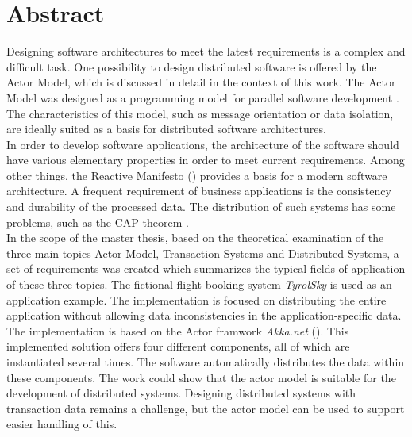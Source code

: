 
\chapter*{Abstract}
Designing software architectures to meet the latest requirements is a complex and difficult task. One possibility to design distributed software is offered by the Actor Model, which is discussed in detail in the context of this work. The Actor Model was designed as a programming model for parallel software development \citep{hewitt1973session}. The characteristics of this model, such as message orientation or data isolation, are ideally suited as a basis for distributed software architectures. \\
In order to develop software applications, the architecture of the software should have various elementary properties in order to meet current requirements. Among other things, the Reactive Manifesto (\cite{reactiveManifesto}) provides a basis for a modern software architecture. 
A frequent requirement of business applications is the consistency and durability of the processed data. The distribution of such systems has some problems, such as the CAP theorem \citep{gilbertPerspectiveCAPTheorem2012}. \\
In the scope of the master thesis, based on the theoretical examination of the three main topics Actor Model, Transaction Systems and Distributed Systems, a set of requirements was created which summarizes the typical fields of application of these three topics.  The fictional flight booking system \textit{TyrolSky} is used as an application example.  The implementation is focused on distributing the entire application without allowing data inconsistencies in the application-specific data.  \\
The implementation is based on the Actor framwork \textit{Akka.net} (\cite{Akka.netCommunityAkka.NETDocumentation}). This implemented solution offers four different components, all of which are instantiated several times. The software automatically distributes the data within these components.
The work could show that the actor model is suitable for the development of distributed systems. Designing distributed systems with transaction data remains a challenge, but the actor model can be used to support easier handling of this.


\cleardoublepage
{} %